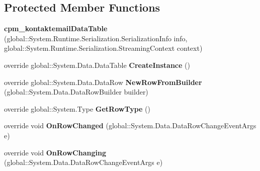 \subsection*{Protected Member Functions}
\begin{DoxyCompactItemize}
\item 
{\bfseries cpm\+\_\+kontaktemail\+Data\+Table} (global\+::\+System.\+Runtime.\+Serialization.\+Serialization\+Info info, global\+::\+System.\+Runtime.\+Serialization.\+Streaming\+Context context)\hypertarget{class_products_1_1_data_1_1ds_sage_1_1cpm__kontaktemail_data_table_a63ad62bdcb757f521c903e177ad55ef8}{}\label{class_products_1_1_data_1_1ds_sage_1_1cpm__kontaktemail_data_table_a63ad62bdcb757f521c903e177ad55ef8}

\item 
override global\+::\+System.\+Data.\+Data\+Table {\bfseries Create\+Instance} ()\hypertarget{class_products_1_1_data_1_1ds_sage_1_1cpm__kontaktemail_data_table_ab5fcd1ba64d5ca570516447d562a94da}{}\label{class_products_1_1_data_1_1ds_sage_1_1cpm__kontaktemail_data_table_ab5fcd1ba64d5ca570516447d562a94da}

\item 
override global\+::\+System.\+Data.\+Data\+Row {\bfseries New\+Row\+From\+Builder} (global\+::\+System.\+Data.\+Data\+Row\+Builder builder)\hypertarget{class_products_1_1_data_1_1ds_sage_1_1cpm__kontaktemail_data_table_acab28ab88b39f04abbca5c47d3193d50}{}\label{class_products_1_1_data_1_1ds_sage_1_1cpm__kontaktemail_data_table_acab28ab88b39f04abbca5c47d3193d50}

\item 
override global\+::\+System.\+Type {\bfseries Get\+Row\+Type} ()\hypertarget{class_products_1_1_data_1_1ds_sage_1_1cpm__kontaktemail_data_table_aca54f15d7b3b323e829818e8cae53c36}{}\label{class_products_1_1_data_1_1ds_sage_1_1cpm__kontaktemail_data_table_aca54f15d7b3b323e829818e8cae53c36}

\item 
override void {\bfseries On\+Row\+Changed} (global\+::\+System.\+Data.\+Data\+Row\+Change\+Event\+Args e)\hypertarget{class_products_1_1_data_1_1ds_sage_1_1cpm__kontaktemail_data_table_a9ef5ee596d5694026e7ec092ca07cf9f}{}\label{class_products_1_1_data_1_1ds_sage_1_1cpm__kontaktemail_data_table_a9ef5ee596d5694026e7ec092ca07cf9f}

\item 
override void {\bfseries On\+Row\+Changing} (global\+::\+System.\+Data.\+Data\+Row\+Change\+Event\+Args e)\hypertarget{class_products_1_1_data_1_1ds_sage_1_1cpm__kontaktemail_data_table_a4e5c262b51c332a1ce1abcd1c74ba5ad}{}\label{class_products_1_1_data_1_1ds_sage_1_1cpm__kontaktemail_data_table_a4e5c262b51c332a1ce1abcd1c74ba5ad}


\end{DoxyCompactItemize}
